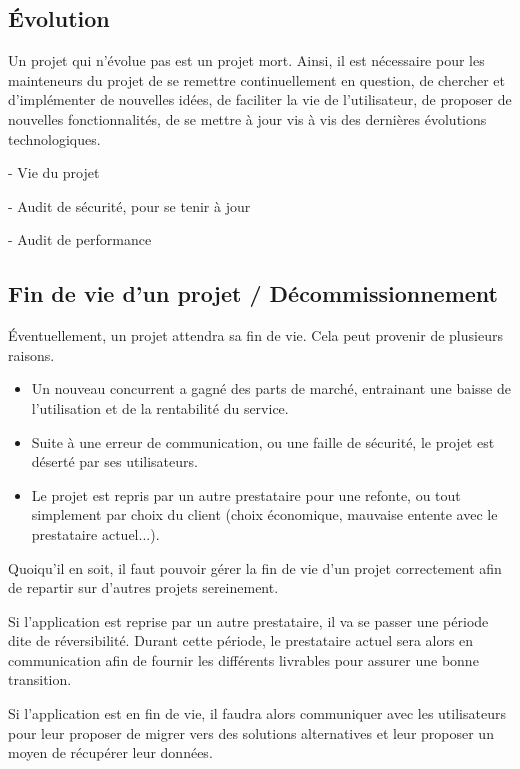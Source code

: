 
\subsection{Évolution}

Un projet qui n'évolue pas est un projet mort. Ainsi, il est nécessaire pour les mainteneurs du projet de se remettre continuellement en question, de chercher et d'implémenter de nouvelles idées, de faciliter la vie de l'utilisateur, de proposer de nouvelles fonctionnalités, de se mettre à jour vis à vis des dernières évolutions technologiques.


- Vie du projet

- Audit de sécurité, pour se tenir à jour

- Audit de performance

\subsection{Fin de vie d'un projet / Décommissionnement}

Éventuellement, un projet attendra sa fin de vie. Cela peut provenir de plusieurs raisons.

\begin{itemize}
	\item Un nouveau concurrent a gagné des parts de marché, entrainant une baisse de l'utilisation et de la rentabilité du service.
	\item Suite à une erreur de communication, ou une faille de sécurité, le projet est déserté par ses utilisateurs.
	\item Le projet est repris par un autre prestataire pour une refonte, ou tout simplement par choix du client (choix économique, mauvaise entente avec le prestataire actuel...).
\end{itemize}

Quoiqu'il en soit, il faut pouvoir gérer la fin de vie d'un projet correctement afin de repartir sur d'autres projets sereinement. 

Si l'application est reprise par un autre prestataire, il va se passer une période dite de réversibilité. Durant cette période, le prestataire actuel sera alors en communication afin de fournir les différents livrables pour assurer une bonne transition. 

Si l'application est en fin de vie, il faudra alors communiquer avec les utilisateurs pour leur proposer de migrer vers des solutions alternatives et leur proposer un moyen de récupérer leur données.
